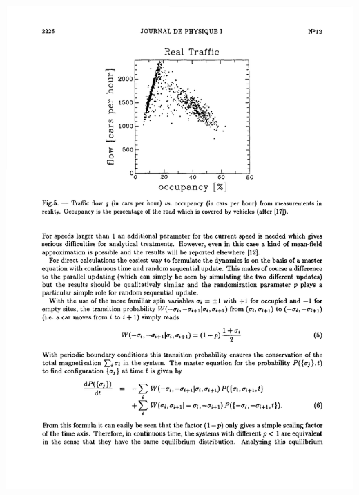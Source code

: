 \documentclass[slidetop,11pt]{beamer}
\begin{document}
\begin{frame}
\includegraphics[scale = 0.7]{./images/dfondcompre}
\end{frame}
\end{document}
